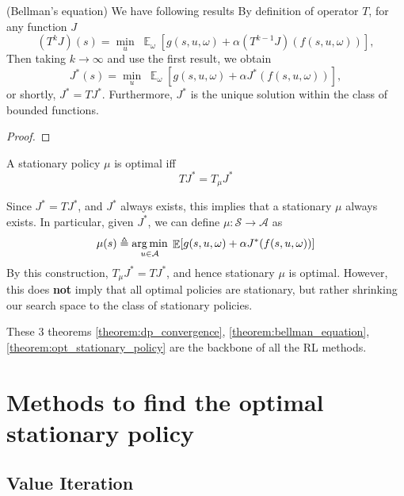 \documentclass[11pt,a4paper]{article}
\begin{document}
\begin{theorem}(Bellman's equation)
    \label{theorem:bellman_equation}
We have following results \parencite[Section 1.1.3]{bertsekas1999dynamic}
By definition of operator $T$, for any function $J$
\[
(T^{k} J)(s) = \min_{u} \; \mathop{\mathbb{E}}_{\omega} \left[ g(s, u, \omega) + \alpha (T^{k-1} J)(f(s, u, \omega)) \right],
\] 
Then taking $k \to \infty$ and use the first result, we obtain
\begin{equation}
\label{eq:bellman}
J^{* }(s) = \min_{u} \; \mathop{\mathbb{E}}_{\omega} \left[ g(s, u, \omega) + \alpha J^{* }(f(s, u, \omega)) \right],
\end{equation} 
or shortly, $J^{* } = T J^{* }$. Furthermore, $J^{*}$ is the unique solution within the class of bounded functions.
\end{theorem}
\begin{proof}
    
\end{proof}
\begin{theorem}
    \label{theorem:opt_stationary_policy}
    A stationary policy $\mu$ is optimal iff
    \[
    T J^{*} = T_\mu J^{*}
    \] 
\end{theorem}
Since $J^{*} = TJ^{*}$, and $J^{*}$ always exists, this implies that a stationary $\mu$ always exists. In particular, given $J^{*}$, we can define $\mu: \mathcal{S} \rightarrow \mathcal{A}$ as
\[
\mu(s) \triangleq \operatorname*{arg\,min}_{u \in \mathcal{A}}\; \mathop{\mathbb{E}}[g(s, u, \omega) + \alpha J^{*}(f(s, u, \omega))]
\] 
By this construction, $T_{\mu} J^{*} = T J^{*}$, and hence stationary $\mu$ is optimal.
However, this does \textbf{not} imply that all optimal policies are stationary, but rather shrinking our search space to the class of stationary policies.

These 3 theorems \ref{theorem:dp_convergence}, \ref{theorem:bellman_equation}, \ref{theorem:opt_stationary_policy} are the backbone of all the RL methods. 

\section{Methods to find the optimal stationary policy}%
\label{sec:methods_to_find_the_optimal_stationary_policy}

\subsection{Value Iteration}%
\label{sub:value_iteration}
\end{document}

